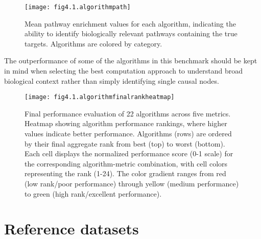 \begin{figure}[htbp]
    \centering
    \texttt{[image: fig4.1.algorithmpath]}
    \caption[Mean pathway enrichment values for each algorithm.]{Mean pathway enrichment values for each algorithm, indicating the ability to identify biologically relevant pathways containing the true targets. Algorithms are colored by category.}
    \label{fig:fig4.1.algorithmpath}
\end{figure}

The outperformance of some of the algorithms in this benchmark should be kept in mind when selecting the best computation approach to understand broad biological context rather than simply identifying single causal nodes. 

\begin{figure}[htbp]
    \centering
    \texttt{[image: fig4.1.algorithmfinalrankheatmap]}
    \caption[Final performance evaluation of 22 algorithms across five metrics.]{Final performance evaluation of 22 algorithms across five metrics. Heatmap showing algorithm performance rankings, where higher values indicate better performance. Algorithms (rows) are ordered by their final aggregate rank from best (top) to worst (bottom). Each cell displays the normalized performance score (0-1 scale) for the corresponding algorithm-metric combination, with cell colors representing the rank (1-24). The color gradient ranges from red (low rank/poor performance) through yellow (medium performance) to green (high rank/excellent performance). }
    \label{fig:fig4.1.algorithmfinalrankheatmap}
\end{figure}


\section{Reference datasets} %
\label{sec:referencedatasetsresults}

